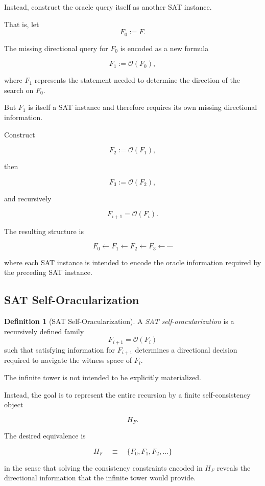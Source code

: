 \documentclass[11pt]{article}
\theoremstyle{plain}
\theoremstyle{definition}
\newtheorem{definition}[theorem]{Definition}
\begin{document}
Instead, construct the oracle query itself as another SAT instance.

That is, let
\[
    F_0:=F.
\]

The missing directional query for \(F_0\) is encoded as a new formula

\[
    F_1:=\mathcal{O}(F_0),
\]

where \(F_1\) represents the statement needed to determine the direction of
the search on \(F_0\).

But \(F_1\) is itself a SAT instance and therefore requires its own missing
directional information.

Construct

\[
    F_2:=\mathcal{O}(F_1),
\]

then

\[
    F_3:=\mathcal{O}(F_2),
\]

and recursively

\[
    F_{i+1}=\mathcal{O}(F_i).
\]

The resulting structure is

\[
\boxed{
F_0
\leftarrow
F_1
\leftarrow
F_2
\leftarrow
F_3
\leftarrow
\cdots
}
\]

where each SAT instance is intended to encode the oracle information required
by the preceding SAT instance.

\subsection{SAT Self-Oracularization}

\begin{definition}[SAT Self-Oracularization]
\label{def:sat-self-oracularization}
A \emph{SAT self-oracularization} is a recursively defined family
\[
    F_{i+1}=\mathcal{O}(F_i)
\]
such that satisfying information for \(F_{i+1}\) determines a directional
decision required to navigate the witness space of \(F_i\).
\end{definition}

The infinite tower is not intended to be explicitly materialized.

Instead, the goal is to represent the entire recursion by a finite
self-consistency object

\[
    H_F.
\]

The desired equivalence is

\[
\boxed{
H_F
\quad\equiv\quad
\{F_0,F_1,F_2,\dots\}
}
\]

in the sense that solving the consistency constraints encoded in \(H_F\)
reveals the directional information that the infinite tower would provide.
\end{document}

